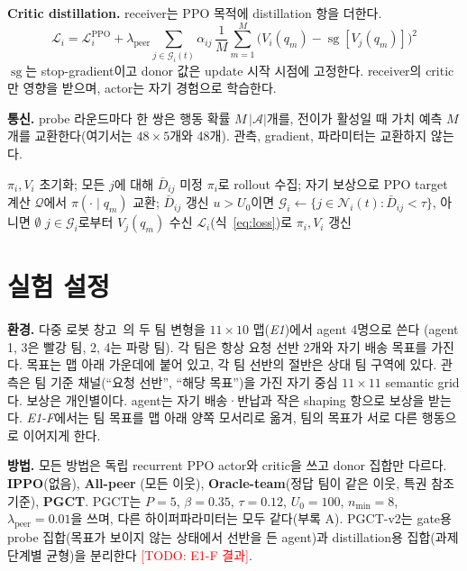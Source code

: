 \documentclass[twocolumn,10pt]{article}
\newcommand{\todo}[1]{\textcolor{red}{[TODO: #1]}}
\newcommand{\sg}{\operatorname{sg}}
\newcommand{\ours}{PGCT}
\begin{document}
\textbf{Critic distillation.} receiver는 PPO 목적에 distillation 항을 더한다.
\begin{equation}
  \mathcal{L}_i = \mathcal{L}^{\mathrm{PPO}}_i + \lambda_{\mathrm{peer}} \sum_{j\in\mathcal{G}_i(t)} \alpha_{ij}\,
  \frac{1}{M}\sum_{m=1}^{M}\big(V_i(q_m) - \sg[V_j(q_m)]\big)^2
  \label{eq:loss}
\end{equation}
$\sg$는 stop-gradient이고 donor 값은 update 시작 시점에 고정한다. receiver의 critic만 영향을 받으며, actor는 자기 경험으로 학습한다.

\textbf{통신.} probe 라운드마다 한 쌍은 행동 확률 $M\,|\mathcal{A}|$개를, 전이가 활성일 때 가치 예측 $M$개를 교환한다(여기서는
$48\times5$개와 48개). 관측, gradient, 파라미터는 교환하지 않는다.

\begin{algorithm}[t]
\caption{agent $i$의 \ours{}}
\label{alg:pgct}
\begin{algorithmic}[1]
\State $\pi_i, V_i$ 초기화; 모든 $j$에 대해 $\bar D_{ij}$ 미정
  \State $\pi_i$로 rollout 수집; 자기 보상으로 PPO target 계산
      \State $\mathcal{Q}$에서 $\pi(\cdot\mid q_m)$ 교환; $\bar D_{ij}$ 갱신
    \EndFor
  \EndIf
  \State $u>U_0$이면 $\mathcal{G}_i\gets\{j\in\mathcal{N}_i(t): \bar D_{ij}<\tau\}$, 아니면 $\emptyset$
  \State $j\in\mathcal{G}_i$로부터 $V_j(q_m)$ 수신
  \State $\mathcal{L}_i$(식~\ref{eq:loss})로 $\pi_i, V_i$ 갱신
\EndFor
\end{algorithmic}
\end{algorithm}

\section{실험 설정}
\label{sec:setup}
\textbf{환경.} 다중 로봇 창고~\cite{papoudakis2021benchmarking}의 두 팀 변형을 $11\times10$ 맵(\emph{E1})에서 agent 4명으로 쓴다
(agent 1, 3은 빨강 팀, 2, 4는 파랑 팀). 각 팀은 항상 요청 선반 2개와 자기 배송 목표를 가진다. 목표는 맵 아래 가운데에 붙어 있고, 각
팀 선반의 절반은 상대 팀 구역에 있다. 관측은 팀 기준 채널(``요청 선반'', ``해당 목표'')을 가진 자기 중심 $11\times11$ semantic grid다.
보상은 개인별이다. agent는 자기 배송·반납과 작은 shaping 항으로 보상을 받는다. \emph{E1-F}에서는 팀 목표를 맵 아래 양쪽 모서리로
옮겨, 팀의 목표가 서로 다른 행동으로 이어지게 한다.

\textbf{방법.} 모든 방법은 독립 recurrent PPO actor와 critic을 쓰고 donor 집합만 다르다. \textbf{IPPO}(없음), \textbf{All-peer}
(모든 이웃), \textbf{Oracle-team}(정답 팀이 같은 이웃, 특권 참조 기준), \textbf{\ours{}}. \ours{}는 $P=5$, $\beta=0.35$, $\tau=0.12$,
$U_0=100$, $n_{\min}=8$, $\lambda_{\mathrm{peer}}=0.01$을 쓰며, 다른 하이퍼파라미터는 모두 같다(부록 A). \ours{}-v2는 gate용 probe
집합(목표가 보이지 않는 상태에서 선반을 든 agent)과 distillation용 집합(과제 단계별 균형)을 분리한다 \todo{E1-F 결과}.
\end{document}
